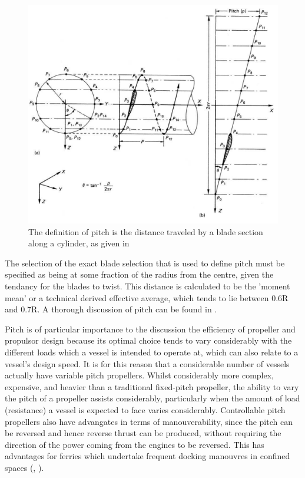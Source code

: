 \documentclass{article}\usepackage[]{graphicx}\usepackage[]{color}
\begin{document}
\begin{figure}
\includegraphics[width=\textwidth]{PitchDefinition.png}
\caption{The definition of pitch is the distance traveled by a blade section along a cylinder, as given in \parencite{carlton2007}}
\label{fig:PitchDefinition.png}
\end{figure}

The selection of the exact blade selection that is used to define pitch must be specified as being at some fraction of the radius from the centre, given the tendancy for the blades to twist.  This distance is calculated to be the 'moment mean' or a technical derived effective average, which tends to lie between 0.6R and 0.7R.  A thorough discussion of pitch can be found in \cite[35-37]{carlton2007}.

Pitch is of particular importance to the discussion the efficiency of propeller and propulsor design because its optimal choice tends to vary considerably with the different loads which a vessel is intended to operate at, which can also relate to a vessel's design speed.  It is for this reason that a considerable number of vessels actually have variable pitch propellers.  Whilst considerably more complex, expensive, and heavier than a traditional fixed-pitch propeller, the ability to vary the pitch of a propeller assists considerably, particularly when the amount of load (resistance) a vessel is expected to face varies considerably.  Controllable pitch propellers also have advangates in terms of manouverability, since the pitch can be reversed and hence reverse thrust can be produced, without requiring the direction of the power coming from the engines to be reversed.  This has advantages for ferries which undertake frequent docking manouvres in confined spaces (\cite{MAN2017}, \cite{lewis1988}).
\end{document}
